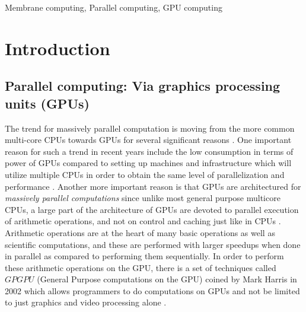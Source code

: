\documentclass{svmultm}
\begin{document}
  Membrane computing, Parallel computing, GPU computing



\section{Introduction}

\subsection{Parallel computing: Via graphics processing units (GPUs)}
The trend for massively parallel computation is moving from the more common multi-core CPUs towards  {GPUs} for several significant reasons \cite{cudabook, cudaguide}. One important reason for such a trend in recent years include the low consumption in terms of power of  {GPUs} compared to setting up machines and infrastructure which will utilize multiple CPUs in order to obtain the same level of parallelization and performance \cite{cudapage}. Another more important reason is that  {GPUs} are architectured for \textit{massively parallel computations} since unlike most general purpose multicore CPUs, a large part of the architecture of GPUs are devoted to parallel execution of arithmetic operations, and not on control and caching just like in CPUs \cite{cudabook, cudaguide}. Arithmetic operations are at the heart of many basic operations as well as scientific computations, and these are performed with larger speedups when done in parallel as compared to performing them sequentially. In order to perform these arithmetic operations on the GPU, there is a set of techniques called $GPGPU$ (General Purpose computations on the GPU) coined by Mark Harris in 2002 which allows programmers to do computations on GPUs and not be limited to just graphics and video processing alone \cite{gpgpu}. 
\end{document}
